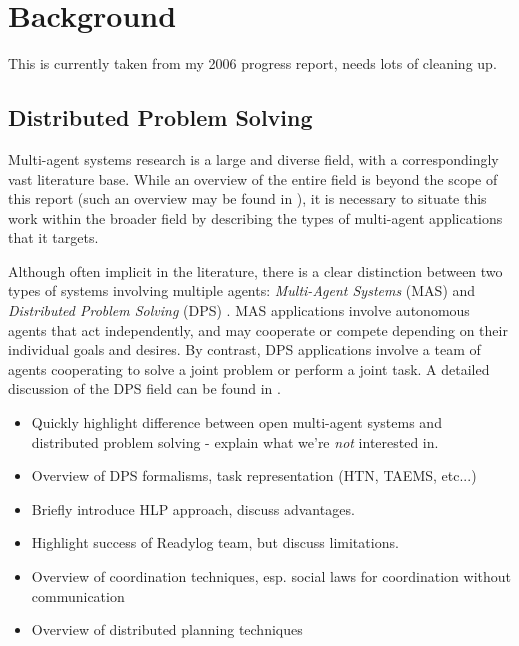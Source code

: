 \chapter{Background}\label{ch:background}

This is currently taken from my 2006 progress report, needs lots
of cleaning up.

\section{Distributed Problem Solving}

Multi-agent systems research is a large and diverse field, with a
correspondingly vast literature base. While an overview of the entire
field is beyond the scope of this report (such an overview may be
found in \cite{nwana95software_agents,mataric95issues_designing_agents}),
it is necessary to situate this work within the broader field by describing
the types of multi-agent applications that it targets.

Although often implicit in the literature, there is a clear distinction
between two types of systems involving multiple agents: \emph{Multi-Agent
Systems} (MAS) and \emph{Distributed Problem Solving} (DPS) \cite{nwana95software_agents,mataric95issues_designing_agents}.
MAS applications involve autonomous agents that act independently,
and may cooperate or compete depending on their individual goals and
desires. By contrast, DPS applications involve a team of agents cooperating
to solve a joint problem or perform a joint task. A detailed discussion
of the DPS field can be found in \cite{Durfee91dps}.

\begin{itemize}
\item Quickly highlight difference between open multi-agent systems and
distributed problem solving - explain what we're \emph{not} interested in.
\item Overview of DPS formalisms, task representation (HTN, TAEMS, etc...)
\item Briefly introduce HLP approach, discuss advantages.
\item Highlight success of Readylog team, but discuss limitations.
\item Overview of coordination techniques, esp. social laws for coordination without communication
\item Overview of distributed planning techniques \cite{desjardins99survey_dist_planning}
\end{itemize}

